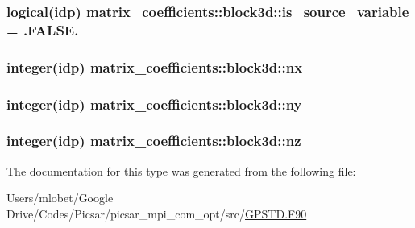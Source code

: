 \subsubsection[{\texorpdfstring{is\+\_\+source\+\_\+variable}{is_source_variable}}]{\setlength{\rightskip}{0pt plus 5cm}logical(idp) matrix\+\_\+coefficients\+::block3d\+::is\+\_\+source\+\_\+variable = .F\+A\+L\+S\+E.}\hypertarget{structmatrix__coefficients_1_1block3d_a5804e48e4dad384abb0789ad932b04d9}{}\label{structmatrix__coefficients_1_1block3d_a5804e48e4dad384abb0789ad932b04d9}
\subsubsection[{\texorpdfstring{nx}{nx}}]{\setlength{\rightskip}{0pt plus 5cm}integer(idp) matrix\+\_\+coefficients\+::block3d\+::nx}\hypertarget{structmatrix__coefficients_1_1block3d_af4e4f83e09cc6967c8204cd22ba39ce7}{}\label{structmatrix__coefficients_1_1block3d_af4e4f83e09cc6967c8204cd22ba39ce7}
\subsubsection[{\texorpdfstring{ny}{ny}}]{\setlength{\rightskip}{0pt plus 5cm}integer(idp) matrix\+\_\+coefficients\+::block3d\+::ny}\hypertarget{structmatrix__coefficients_1_1block3d_a5b50d6852afa142b18507bed4feaf58f}{}\label{structmatrix__coefficients_1_1block3d_a5b50d6852afa142b18507bed4feaf58f}
\subsubsection[{\texorpdfstring{nz}{nz}}]{\setlength{\rightskip}{0pt plus 5cm}integer(idp) matrix\+\_\+coefficients\+::block3d\+::nz}\hypertarget{structmatrix__coefficients_1_1block3d_aaef29da070e781dbf45d55e239521f98}{}\label{structmatrix__coefficients_1_1block3d_aaef29da070e781dbf45d55e239521f98}


The documentation for this type was generated from the following file\+:\begin{DoxyCompactItemize}
\item 
Users/mlobet/\+Google Drive/\+Codes/\+Picsar/picsar\+\_\+mpi\+\_\+com\+\_\+opt/src/\hyperlink{_g_p_s_t_d_8_f90}{G\+P\+S\+T\+D.\+F90}\end{DoxyCompactItemize}
